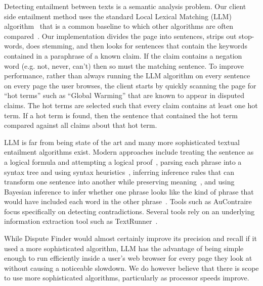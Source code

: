 \documentclass{www2010-submission}
\newcommand{\todo}[1]{}
\begin{document}
Detecting entailment between texts is a semantic analysis problem. Our client side entailment method uses the standard Local Lexical Matching (LLM) algorithm~\cite{Jijkoun2006} that is a common baseline to which other algorithms are often compared~\cite{Braz}. Our implementation divides the page into sentences, strips out stop-words, does stemming, and then looks for sentences that contain the keywords contained in a paraphrase of a known claim. If the claim contains a negation word (e.g. not, never, can't) then so must the matching sentence. To improve performance, rather than always running the LLM algorithm on every sentence on every page the user browses, the client starts by quickly scanning the page for ``hot terms'' such as ``Global Warming'' that are known to appear in disputed claims. The hot terms are selected such that every claim contains at least one hot term. If a hot term is found, then the sentence that contained the hot term compared against all claims about that hot term.

LLM is far from being state of the art and many more sophisticated textual entailment algorithms exist. Modern approaches include treating the sentence as a logical formula and attempting a logical proof~\cite{Bayer2001,Bos2005}, parsing each phrase into a syntax tree and using syntax heuristics~\cite{Snow2006}, inferring inference rules that can transform one sentence into another while preserving meaning~\cite{Lin2002,Dinu2009,Bhagat2009}, and using Bayesian inference to infer whether one phrase looks like the kind of phrase that would have included each word in the other phrase~\cite{Glickman2005}. Tools such as AuContraire~\cite{Ritter} focus specifically on detecting contradictions. Several tools rely on an underlying information extraction tool such as TextRunner~\cite{Etzioni2008}.

While Dispute Finder would almost certainly improve its precision and recall if it used a more sophisticated algorithm, LLM has the advantage of being simple enough to run efficiently inside a user's web browser for every page they look at without causing a noticeable slowdown. We do however believe that there is scope to use more sophisticated algorithms, particularly as processor speeds improve.


\todo{Mention that we could add the +ve and -ve n-grams to the client code? Actually do this?}

\todo{Discuss how and why this is simpler than the server-side classification method}
\todo{Explain how we avoid downloading the entire database}
\end{document}
